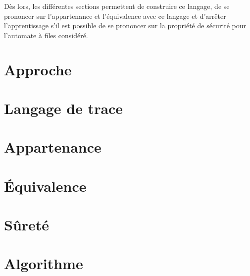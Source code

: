 Dès lors, les différentes sections permettent de construire ce langage, de se prononcer sur l'appartenance et l'équivalence avec ce langage et d'arrêter l'apprentissage s'il est possible de se prononcer sur la propriété de sécurité pour l'automate à files considéré.


\section{Approche}\label{app}
\section{Langage de trace}\label{trace}
\section{Appartenance}\label{mem}
\section{Équivalence}\label{eq}
\section{Sûreté}\label{safety}
\section{Algorithme}\label{lever}
